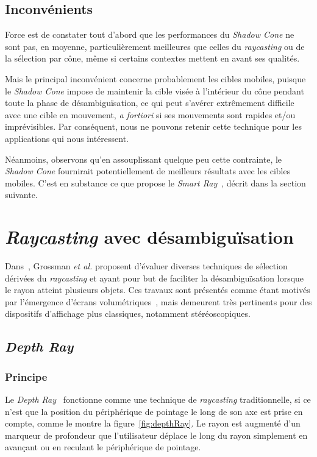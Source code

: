 	\subsection{Inconvénients}
	Force est de constater tout d'abord que les performances du \emph{Shadow Cone} ne sont pas, en moyenne, particulièrement meilleures que celles du \emph{raycasting} ou de la sélection par cône, même si certains contextes mettent en avant ses qualités.
	
	Mais le principal inconvénient concerne probablement les cibles mobiles, puisque le \emph{Shadow Cone} impose de maintenir la cible visée à l'intérieur du cône pendant toute la phase de désambiguïsation, ce qui peut s'avérer extrêmement difficile avec une cible en mouvement, \emph{a fortiori} si ses mouvements sont rapides et/ou imprévisibles. Par conséquent, nous ne pouvons retenir cette technique pour les applications qui nous intéressent.
	
	Néanmoins, observons qu'en assouplissant quelque peu cette contrainte, le \emph{Shadow Cone} fournirait potentiellement de meilleurs résultats avec les cibles mobiles. C'est en substance ce que propose le \emph{Smart Ray}~\cite{grossman2006design}, décrit dans la section suivante.	
	
\section{\emph{Raycasting} avec désambiguïsation}
	Dans~\cite{grossman2006design}, Grossman \emph{et al.} proposent d'évaluer diverses techniques de sélection dérivées du \emph{raycasting} et ayant pour but de faciliter la désambiguïsation lorsque le rayon atteint plusieurs objets. Ces travaux sont présentés comme étant motivés par l'émergence d'écrans volumétriques~\cite{ebert1999realizing}, mais demeurent très pertinents pour des dispositifs d'affichage plus classiques, notamment stéréoscopiques.

	\subsection{\emph{Depth Ray}}
	\subsubsection{Principe}
	Le \emph{Depth Ray}~\cite{grossman2006design} fonctionne comme une technique de \emph{raycasting} traditionnelle, si ce n'est que la position du périphérique de pointage le long de son axe est prise en compte, comme le montre la figure~\ref{fig:depthRay}. Le rayon est augmenté d'un marqueur de profondeur que l'utilisateur déplace le long du rayon simplement en avançant ou en reculant le périphérique de pointage.
	
